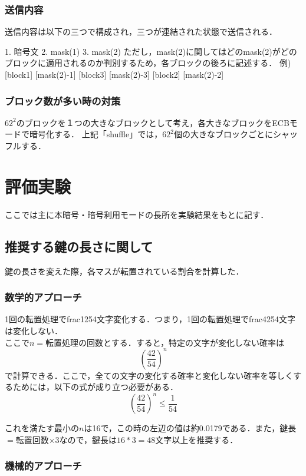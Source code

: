 \documentclass{jsarticle}
\begin{document}
\subsubsection{送信内容}
送信内容は以下の三つで構成され，三つが連結された状態で送信される．

1. 暗号文
2. mask(1)
3. mask(2)
ただし，mask(2)に関してはどのmask(2)がどのブロックに適用されるのか判別するため，各ブロックの後ろに記述する．
例) [block1] [mask(2)-1] [block3] [mask(2)-3] [block2] [mask(2)-2]

\subsubsection{ブロック数が多い時の対策}
\(62^2\)のブロックを１つの大きなブロックとして考え，各大きなブロックをECBモードで暗号化する．
上記「shuffle」では，\(62^2\)個の大きなブロックごとにシャッフルする．

\section{評価実験}
ここでは主に本暗号・暗号利用モードの長所を実験結果をもとに記す．
\subsection{推奨する鍵の長さに関して}
鍵の長さを変えた際，各マスが転置されている割合を計算した．\\

\subsubsection{数学的アプローチ}
1回の転置処理でfrac{12}{54}文字変化する．つまり，1回の転置処理でfrac{42}{54}文字は変化しない．\\
ここで$n=$転置処理の回数とする．すると，特定の文字が変化しない確率は
\[\left(\frac{42}{54}\right)^n\]
で計算できる．ここで，全ての文字の変化する確率と変化しない確率を等しくするためには，以下の式が成り立つ必要がある．
\[\left(\frac{42}{54}\right)^n \leq \frac{1}{54}\]

これを満たす最小の$n$は16で，この時の左辺の値は約0.0179である．また，鍵長$=$転置回数$\times 3$なので，鍵長は$16*3=48$文字以上を推奨する．

\subsubsection{機械的アプローチ}
\end{document}
